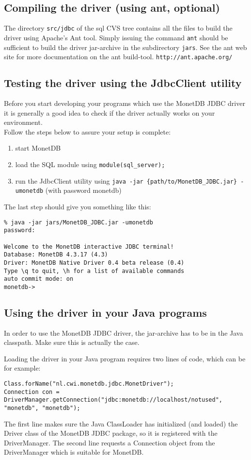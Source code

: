 \documentclass{article}
\begin{document}
\subsection{Compiling the driver (using ant, optional)}
The directory \texttt{src/jdbc} of the sql CVS tree contains all the files to build the driver using
Apache's Ant tool. Simply issuing the command \texttt{ant} should be sufficient to build the driver
jar-archive in the subdirectory \texttt{jars}. See the ant web site for more documentation on the
ant build-tool. \texttt{http://ant.apache.org/}

\subsection{Testing the driver using the JdbcClient utility}
Before you start developing your programs which use the MonetDB JDBC driver it is generally
a good idea to check if the driver actually works on your environment.\\
Follow the steps below to assure your setup is complete:
\begin{enumerate}
\item start MonetDB
\item load the SQL module using \texttt{module(sql\_server);}
\item run the JdbcClient utility using \texttt{java -jar \{path/to/MonetDB_JDBC.jar\} -umonetdb} (with
 password monetdb)
\end{enumerate}
The last step should give you something like this:
\begin{verbatim}
% java -jar jars/MonetDB_JDBC.jar -umonetdb
password:

Welcome to the MonetDB interactive JDBC terminal!
Database: MonetDB 4.3.17 (4.3)
Driver: MonetDB Native Driver 0.4 beta release (0.4)
Type \q to quit, \h for a list of available commands
auto commit mode: on
monetdb->
\end{verbatim}

\subsection{Using the driver in your Java programs}
In order to use the MonetDB JDBC driver, the jar-archive has to be in the Java classpath.
Make sure this is actually the case.

Loading the driver in your Java program requires two lines of code, which can be for example:
\begin{verbatim}
Class.forName("nl.cwi.monetdb.jdbc.MonetDriver");
Connection con = DriverManager.getConnection("jdbc:monetdb://localhost/notused", "monetdb", "monetdb");
\end{verbatim}
The first line makes sure the Java ClassLoader has initialized (and loaded) the Driver class of the MonetDB
JDBC package, so it is registered with the DriverManager. The second line requests a Connection
object from the DriverManager which is suitable for MonetDB.
\end{document}
